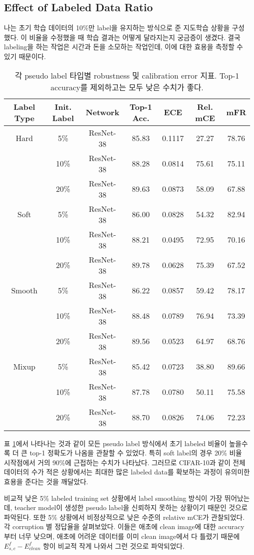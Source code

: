 \subsection{Effect of Labeled Data Ratio}
나는 초기 학습 데이터의 10\%만 label을 유지하는 방식으로 준 지도학습 상황을 구성했다. 이 비율을 수정했을 때 학습 결과는 어떻게 달라지는지 궁금증이 생겼다. 결국 labeling을 하는 작업은 시간과 돈을 소모하는 작업인데, 이에 대한 효용을 측정할 수 있기 때문이다.

\begin{table}[!h]
  \center 
  \begin{tabular}{|c|c|c|c|c|c|c|}
    \hline
    Label Type & Init. Label & Network & Top-1 Acc. & ECE & Rel. mCE & mFR \\ \hline
    Hard & 5\% & ResNet-38 & 85.83 & 0.1117 & 27.27 & 78.76 \\
     & 10\% & ResNet-38 & 88.28 & 0.0814 & 75.61 & 75.11 \\
     & 20\% & ResNet-38 & 89.63 & 0.0873 & 58.09 & 67.88 \\ \hline
    Soft & 5\% & ResNet-38 & 86.00 & 0.0828 & 54.32 & 82.94 \\
     & 10\% & ResNet-38 & 88.21 & 0.0495 & 72.95 & 70.16 \\
     & 20\% & ResNet-38 & 89.78 & 0.0628 & 75.39 & 67.52 \\ \hline
    Smooth & 5\% & ResNet-38 & 86.22 & 0.0857 & 59.42 & 78.17 \\
     & 10\% & ResNet-38 & 88.48 & 0.0789 & 76.94 & 73.39 \\
     & 20\% & ResNet-38 & 89.56 & 0.0523 & 64.97 & 68.76 \\ \hline
    Mixup & 5\% & ResNet-38 & 85.42 & 0.0723 & 38.80 & 89.66 \\
     & 10\% & ResNet-38 & 87.78 & 0.0780 & 50.11 & 75.58 \\
     & 20\% & ResNet-38 & 88.70 & 0.0826 & 74.06 & 72.23 \\ \hline
  \end{tabular}    
  \caption{각 pseudo label 타입별 robustness 및 calibration error 지표. Top-1 accuracy를 제외하고는 모두 낮은 수치가 좋다.}
  \label{ratio}
\end{table}

표 \ref{ratio}에서 나타나는 것과 같이 모든 pseudo label 방식에서 초기 labeled 비율이 높을수록 더 큰 top-1 정확도가 나옴을 관찰할 수 있었다. 특히 soft label의 경우 20\% 비율 시작점에서 거의 90\%에 근접하는 수치가 나타났다. 그러므로 CIFAR-10과 같이 전체 데이터의 수가 적은 상황에서는 최대한 많은 labeled data를 확보하는 과정이 유의미한 효용을 준다는 것을 깨달았다.

비교적 낮은 5\% labeled training set 상황에서 label smoothing 방식이 가장 뛰어났는데, teacher model이 생성한 pseudo label을 신뢰하지 못하는 상황이기 때문인 것으로 파악된다. 또한 5\% 상황에서 비정상적으로 낮은 수준의 relative mCE가 관찰되었다. 각 corruption 별 정답율을 살펴보았다. 이들은 애초에 clean image에 대한 accuracy부터 너무 낮으며, 애초에 어려운 데이터를 이미 clean image에서 다 틀렸기 때문에 $E_{s,c}^f - E_{clean}^f$ 항이 비교적 작게 나와서 그런 것으로 파악되었다.